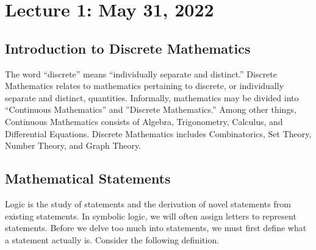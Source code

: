 \section{Lecture 1: May 31, 2022}

    \subsection{Introduction to Discrete Mathematics}
    
        The word ``discrete'' means ``individually separate and distinct.'' Discrete Mathematics relates to mathematics pertaining to discrete, or individually separate and distinct, quantities. Informally, mathematics may be divided into ``Continuous Mathematics'' and ''Discrete Mathematics.'' Among other things, Continuous Mathematics consists of Algebra, Trigonometry, Calculus, and Differential Equations. Discrete Mathematics includes Combinatorics, Set Theory, Number Theory, and Graph Theory.
        
    \subsection{Mathematical Statements}
    
        Logic is the study of statements and the derivation of novel statements from existing statements. In symbolic logic, we will often assign letters to represent statements. Before we delve too much into statements, we must first define what a statement actually is. Consider the following definition.
        
